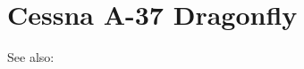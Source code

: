 \section{Cessna A-37 Dragonfly}

\begin{adclist}
\end{adclist}

See also:
\begin{typelist}
\end{typelist}